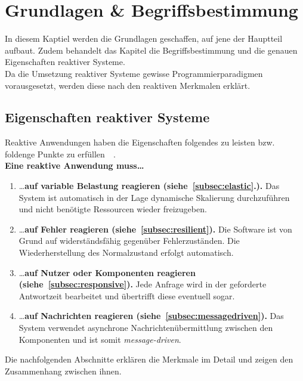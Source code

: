 \chapter{Grundlagen \& Begriffsbestimmung}
In diesem Kaptiel werden die Grundlagen geschaffen, auf jene der Hauptteil aufbaut. Zudem behandelt das Kapitel die Begriffsbestimmung und die genauen Eigenschaften reaktiver Systeme.\\
Da die Umsetzung reaktiver Systeme gewisse Programmierparadigmen vorausgesetzt, werden diese nach den reaktiven Merkmalen erklärt.

\section{Eigenschaften reaktiver Systeme}
Reaktive Anwendungen haben die Eigenschaften folgendes zu leisten bzw. foldenge Punkte zu erfüllen~\cite[S.~19ff]{kuhn_reactive_2015}~\cite[S.~6]{vernon_reactive_2016}.\\

\textbf{Eine reaktive Anwendung muss\ldots}
\begin{enumerate}
\item \ldots \textbf{auf variable Belastung reagieren (siehe~\ref{subsec:elastic}.).} Das System ist automatisch in der Lage dynamische Skalierung durchzuführen und nicht benötigte Ressourcen wieder freizugeben.
\item \ldots \textbf{auf Fehler reagieren (siehe~\ref{subsec:resilient}).} Die Software ist von Grund auf widerständsfähig gegenüber Fehlerzuständen. Die Wiederherstellung des Normalzustand erfolgt automatisch.
\item \ldots \textbf{auf Nutzer oder Komponenten reagieren (siehe~\ref{subsec:responsive}).} Jede Anfrage wird in der geforderte Antwortzeit bearbeitet und übertrifft diese eventuell sogar.
\item \ldots \textbf{auf Nachrichten reagieren (siehe~\ref{subsec:messagedriven}).} Das System verwendet asynchrone Nachrichtenübermittlung zwischen den Komponenten und ist somit \textit{message-driven}.
\end{enumerate}

Die nachfolgenden Abschnitte erklären die Merkmale im Detail und zeigen den Zusammenhang zwischen ihnen.


